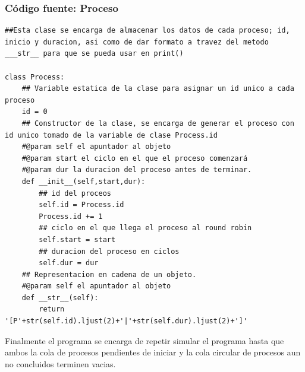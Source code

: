 \documentclass[12pt]{article}
\begin{document}
\subsubsection{Código fuente: Proceso}
\begin{verbatim}
##Esta clase se encarga de almacenar los datos de cada proceso; id, inicio y duracion, asi como de dar formato a travez del metodo ___str__ para que se pueda usar en print()

class Process:
    ## Variable estatica de la clase para asignar un id unico a cada proceso
    id = 0
    ## Constructor de la clase, se encarga de generar el proceso con id unico tomado de la variable de clase Process.id
    #@param self el apuntador al objeto
    #@param start el ciclo en el que el proceso comenzará
    #@param dur la duracion del proceso antes de terminar.
    def __init__(self,start,dur):
        ## id del proceos
        self.id = Process.id
        Process.id += 1
        ## ciclo en el que llega el proceso al round robin
        self.start = start
        ## duracion del proceso en ciclos
        self.dur = dur
    ## Representacion en cadena de un objeto.
    #@param self el apuntador al objeto
    def __str__(self):
        return '[P'+str(self.id).ljust(2)+'|'+str(self.dur).ljust(2)+']'
\end{verbatim}
Finalmente el programa se encarga de repetir simular el programa hasta que ambos la cola de procesos pendientes de iniciar y la cola circular de procesos aun no concluidos terminen vacias. 
\end{document}
